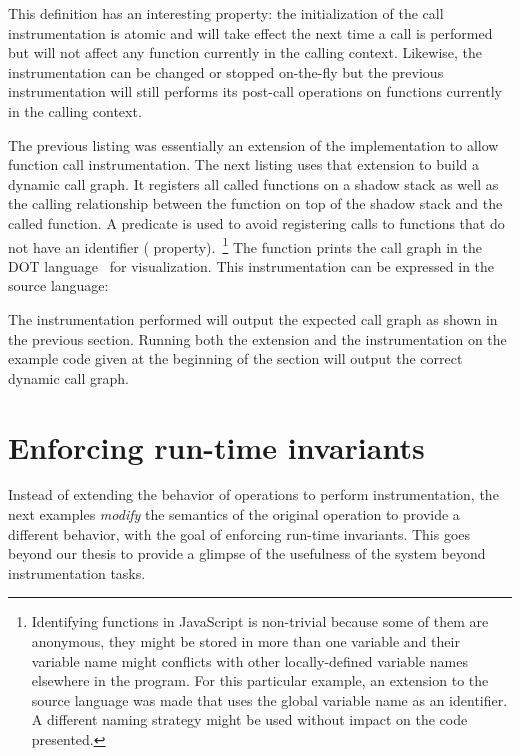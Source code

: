 
This definition has an interesting property: the initialization of the call
instrumentation is atomic and will take effect the next time a call is
performed but will not affect any function currently in the calling context.
Likewise, the instrumentation can be changed or stopped on-the-fly but the
previous instrumentation will still performs its post-call operations on
functions currently in the calling context.

The previous listing was essentially an extension of the implementation to
allow function call instrumentation. The next listing uses that extension to
build a dynamic call graph. It registers all called functions on a shadow stack
as well as the calling relationship between the function on top of the shadow
stack and the called function. A predicate is used to avoid registering calls
to functions that do not have an identifier (
property).~\footnote{Identifying functions in JavaScript is non-trivial because
some of them are anonymous, they might be stored in more than one variable and
their variable name might conflicts with other locally-defined variable names
elsewhere in the program. For this particular example, an extension to the
source language was made that uses the global variable name as an identifier. A
different naming strategy might be used without impact on the code presented.}
The  function prints the call graph in the DOT
language~\cite{DOT} for visualization. This instrumentation can be
expressed in the source language:


The instrumentation performed will output the expected call graph as shown in
the previous section. Running both the extension and the instrumentation on the
example code given at the beginning of the section will output the correct
dynamic call graph.

\section{Enforcing run-time invariants}

Instead of extending the behavior of operations to perform instrumentation, the
next examples \textit{modify} the semantics of the original operation to provide
a different behavior, with the goal of enforcing run-time invariants. This goes
beyond our thesis to provide a glimpse of the usefulness of the system beyond
instrumentation tasks.

